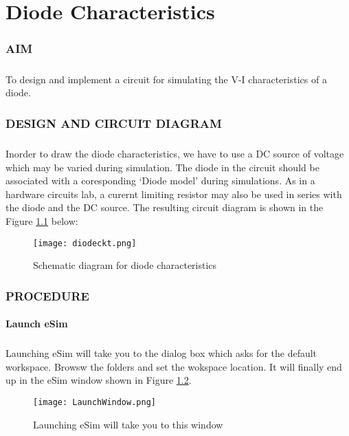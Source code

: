 \chapter{Diode Characteristics}

\subsection*{AIM}
\paragraph{}To design and implement a circuit for simulating the V-I characteristics of a diode.

\subsection*{DESIGN AND CIRCUIT DIAGRAM}
\paragraph{}

Inorder to draw the diode characteristics, we have to use a DC source of voltage which may be varied during simulation. The diode in the circuit should be associated with a coresponding `Diode model' during  simulations. As in a hardware circuits lab, a curernt limiting resistor may also be used in series with the diode and the DC source. The resulting circuit diagram is shown in the Figure \ref{diodeckt}  below:
\begin{figure}[h]
\centering
\texttt{[image: diodeckt.png]}
\caption{Schematic diagram for diode characteristics}
\label{diodeckt}
\end{figure}

\subsection*{PROCEDURE}

\subsubsection{Launch eSim}

\paragraph{}
 Launching eSim will take you to the dialog box which asks for the default workspace. Browsw the folders and set the wokspace location. It will finally end up in the eSim window shown in Figure \ref{LaunchWindow}.
\begin{figure}[h]
\centering
\texttt{[image: LaunchWindow.png]}
\caption{Launching eSim will take you to this window}
\label{LaunchWindow}
\end{figure}

